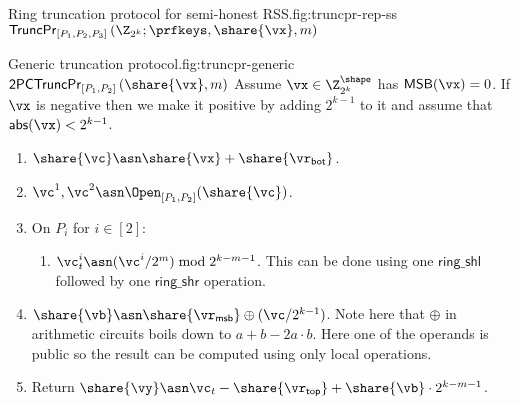 \begin{Boxfig}{Ring truncation protocol for semi-honest
RSS.}{fig:truncpr-rep-ss}{$\mathsf{TruncPr}_{[P_1, P_2, P_3]} \left(\Z_{2^k}; \prfkeys, \share{\vx}, m \right)$}
\begin{enumerate}
\end{enumerate}

\end{Boxfig}

\begin{Boxfig}{Generic truncation protocol.}{fig:truncpr-generic}
  {$\mathsf{2PCTruncPr}_{[P_1, P_2]} \left( \share{\vx}, m \right)$}
  Assume $\vx \in \Z_{2^k}^{\shape}$ has $\mathsf{MSB}(\vx) = 0$. If $\vx$ is negative then
  we make it positive by adding $2^{k-1}$ to it and assume that $\mathsf{abs}(\vx) < 2^{k-1}$. 
  \begin{enumerate}
  
  \item $\share{\vc} \asn \share{\vx} + \share{\vr_{\mathsf{bot}}}$.
  
  \item $\vc^1, \vc^2 \asn \Open_{[P_1, P_2]}(\share{\vc})$.
  
  \item On $P_i$ for $i \in [2]$:
    \begin{enumerate}
    \item $\vc_t^{i} \asn (\vc^i / 2^m) \bmod 2^{k-m-1}$. This can be done using one $\mathsf{ring\_shl}$ followed by one $\mathsf{ring\_shr}$ operation.
    \end{enumerate}
    
  \item $\share{\vb} \asn \share{\vr_{\mathsf{msb}}} \oplus (\vc / 2^{k-1})$. Note here that $\oplus$ in arithmetic circuits boils down to $a + b - 2a\cdot b$. Here one of the operands is public so the result can be computed using only local operations.
    
  \item Return $\share{\vy} \asn \vc_t - \share{\vr_{\mathsf{top}}} + \share{\vb} \cdot 2^{k-m-1}$.
\end{enumerate}

\end{Boxfig}


